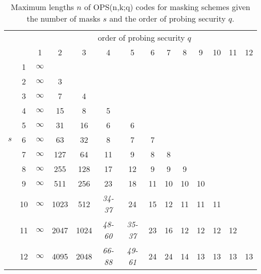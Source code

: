 \documentclass[11pt]{llncs}
\begin{document}
\begin{table}[h!t]
\centering
\begin{tabular*}{\textwidth}{@{\extracolsep{\fill}}|@{\quad}cc|cccccccccccc@{\quad}|}
\hline
    &    & \multicolumn{12}{c|}{order of probing security $q$} \\
    &    &     1    &    2  &      3 &       4  &      5   &      6 &     7  &     8  &     9  &     10 &     11  &    12 \\
\hline
    & 1  & $\infty$  &       &        &          &          &        &        &        &        &        &         &       \\
    & 2  & $\infty$  &    3  &        &          &          &        &        &        &        &        &         &       \\
    & 3  & $\infty$  &    7  &     4  &          &          &        &        &        &        &        &         &       \\
    & 4  & $\infty$  &   15  &     8  &      5   &          &        &        &        &        &        &         &       \\
    & 5  & $\infty$  &   31  &    16  &      6   &     6    &        &        &        &        &        &         &       \\
$s$ & 6  & $\infty$  &   63  &    32  &      8   &     7    &     7  &        &        &        &        &         &       \\
    & 7  & $\infty$  &  127  &    64  &     11   &     9    &     8  &     8  &        &        &        &         &       \\
    & 8  & $\infty$  &  255  &   128  &     17   &    12    &     9  &     9  &     9  &        &        &         &       \\
    & 9  & $\infty$  &  511  &   256  &     23   &    18    &    11  &    10  &    10  &    10  &        &         &       \\
    & 10 & $\infty$  & 1023  &   512  &\em{34-37}&    24    &    15  &    12  &    11  &    11  &    11  &         &       \\
    & 11 & $\infty$  & 2047  &  1024  &\em{48-60}&\em{35-37}&    23  &    16  &    12  &    12  &    12  &    12   &       \\
    & 12 & $\infty$  & 4095  &  2048  &\em{66-88}&\em{49-61}&    24  &    24  &    14  &    13  &    13  &    13   &   13  \\
\hline
\end{tabular*}
\medskip
\caption{Maximum lengths $n$ of OPS(n,k;q) codes for masking schemes
         given the number of masks $s$ and the order of probing security $q$.}
\label{Tab:MaskNo}
\end{table}
\end{document}
